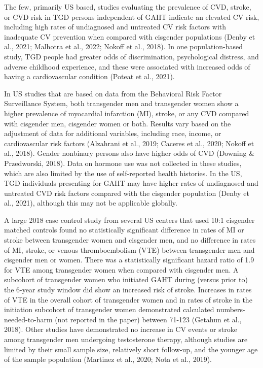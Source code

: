 \documentclass[
]{book}
\begin{document}
The few, primarily US based, studies evaluating
the prevalence of CVD, stroke, or CVD risk in
TGD persons independent of GAHT indicate an
elevated CV risk, including high rates of undiagnosed and untreated CV risk factors with inadequate CV prevention when compared with
cisgender populations (Denby et al., 2021;
Malhotra et al., 2022; Nokoff et al., 2018). In one
population-based study, TGD people had greater
odds of discrimination, psychological distress, and
adverse childhood experience, and these were
associated with increased odds of having a cardiovascular condition (Poteat et al., 2021).

In US studies that are based on data from the
Behavioral Risk Factor Surveillance System, both
transgender men and transgender women show a
higher prevalence of myocardial infarction (MI),
stroke, or any CVD compared with cisgender men,
cisgender women or both. Results vary based on
the adjustment of data for additional variables,
including race, income, or cardiovascular risk factors (Alzahrani et al., 2019; Caceres et al., 2020;
Nokoff et al., 2018). Gender nonbinary persons
also have higher odds of CVD (Downing \&
Przedworski, 2018). Data on hormone use was not
collected in these studies, which are also limited
by the use of self-reported health histories. In the
US, TGD individuals presenting for GAHT may
have higher rates of undiagnosed and untreated
CVD risk factors compared with the cisgender
population (Denby et al., 2021), although this may
not be applicable globally.

A large 2018 case control study from several
US centers that used 10:1 cisgender matched controls found no statistically significant difference
in rates of MI or stroke between transgender
women and cisgender men, and no difference in
rates of MI, stroke, or venous thromboembolism
(VTE) between transgender men and cisgender
men or women. There was a statistically significant hazard ratio of 1.9 for VTE among transgender women when compared with cisgender
men. A subcohort of transgender women who
initiated GAHT during (versus prior to) the
6-year study window did show an increased risk
of stroke. Increases in rates of VTE in the overall
cohort of transgender women and in rates of
stroke in the initiation subcohort of transgender
women demonstrated calculated
numbers-needed-to-harm (not reported in the
paper) between 71-123 (Getahun et al., 2018).
Other studies have demonstrated no increase in
CV events or stroke among transgender men
undergoing testosterone therapy, although studies
are limited by their small sample size, relatively
short follow-up, and the younger age of the sample population (Martinez et al., 2020; Nota
et al., 2019).
\end{document}
